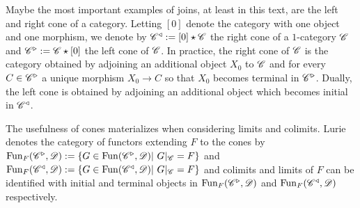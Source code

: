 \documentclass[../../thesis.tex]{subfiles}
\begin{document}
\begin{example}
    Maybe the most important examples of joins, at least in this text, are the left and right cone of a category.
    Letting $[0]$ denote the category with one object and one morphism, we denote by $\mathscr{C}^{\triangleleft}: = [0] \star \mathscr{C}$ the right cone of a $1$-category $\mathscr{C}$ and $\mathscr{C}^{\triangleright}:=\mathscr{C} \star [0]$ the left cone of $\mathscr{C}$.
    In practice, the right cone of $\mathscr{C}$ is the category obtained by adjoining an additional object $X_0$ to $\mathscr{C}$ and for every $C \in \mathscr{C}^{\triangleright}$ a unique morphism $X_0 \to C$ so that $X_0$ becomes terminal in $\mathscr{C}^{\triangleright}$.
    Dually, the left cone is obtained by adjoining an additional object which becomes initial in $\mathscr{C}^{\triangleleft}$.
\end{example}
The usefulness of cones materializes when considering limits and colimits.
Lurie denotes the category of functors extending $F$ to the cones by $\Fun_F(\C^{\triangleright}, \D) : = \{G \in \Fun(\C^{\triangleright}, \D) | G|_{\C} = F\}$ and $\Fun_F(\C^{\triangleleft}, \D): = \{G \in \Fun(\C^{\triangleleft}, \D) | G|_{\C} = F\}$ and colimits and limits of $F$ can be identified with initial and terminal objects in $\mathrm{Fun}_F(\mathscr{C}^{\triangleright}, \mathscr{D})$ and $\mathrm{Fun}_F(\mathscr{C}^{\triangleleft}, \mathscr{D})$ respectively.
\end{document}
